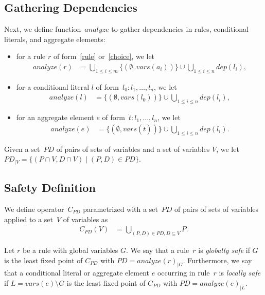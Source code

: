 \documentclass{article}
\newcommand{\tuple}[1]{\dot{#1}}
\newcommand{\set}[1]{\{#1\}}
\newcommand\Vars{\mathit{vars}}
\newcommand\ProDep{\mathit{dep}}
\newcommand\Analyze{\mathit{analyze}}
\newcommand\PD{\mathit{P\!D}}
\newcommand\CheckOp[1]{C_{#1}}
\begin{document}
\subsection{Gathering Dependencies}
	Next, we define function~$\Analyze$ to gather dependencies in rules, conditional literals, and aggregate elements:
	\begin{itemize}
		\item
			for a rule $r$ of form~\eqref{rule} or~\eqref{choice}, we let
			\begin{align*}
				\Analyze(r) &= \bigcup_{1 \leq i \leq m} \set{(\emptyset, \Vars(a_i))} \cup \bigcup_{1 \leq i \leq n} \ProDep(l_i),
			\end{align*}
		\item
			for a conditional literal $l$ of form~$l_0 : l_1, \dots, l_n$, we let
			\begin{align*}
				\Analyze(l) &= \set{(\emptyset, \Vars(l_0))} \cup \bigcup_{1 \leq i \leq n} \ProDep(l_i),
			\end{align*}
		\item
			for an aggregate element $e$ of form~$\tuple{t}: l_1, \dots, l_n$, we let
			\begin{align*}
				\Analyze(e) &= \set{(\emptyset, \Vars(\tuple{t}))} \cup \bigcup_{1 \leq i \leq n} \ProDep(l_i).
			\end{align*}
	\end{itemize}
	Given a set~$\PD$ of pairs of sets of variables and a set of variables $V$, we let $\PD_{|V} = \set{(P \cap V, D \cap V) \mid (P, D) \in \PD}$.


	\subsection{Safety Definition}
	We define operator~$\CheckOp{\PD}$ parametrized with a set~$\PD$ of pairs of sets of variables
	applied to a set~$V$ of variables as
	\begin{align*}
	\CheckOp{\PD}(V) &= \bigcup_{(P,D) \in \PD, D \subseteq V} P.
	\end{align*}

	Let $r$ be a rule with global variables $G$.
	We say that a rule~$r$ is \emph{globally safe}
	if $G$ is the least fixed point of $\CheckOp{\PD}$ with $\PD=\Analyze{(r)}_{|G}$.
	Furthermore, we say that a conditional literal or aggregate element $e$ occurring in rule~$r$ is \emph{locally safe}
	if $L = \Vars(e) \setminus G$ is the least fixed point of $\CheckOp{\PD}$ with $\PD=\Analyze{(e)}_{|L}$.
\end{document}
